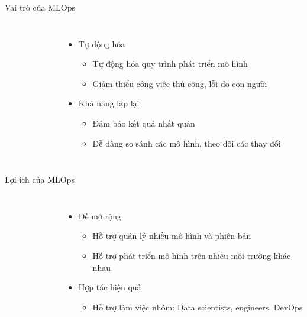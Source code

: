 \documentclass{beamer}
\begin{document}
\begin{frame}{Vai trò của MLOps}
    \begin{columns}
        \begin{figure}
            \centering
        \end{figure}
        \begin{itemize}
            \item Tự động hóa
            \begin{itemize}
                \item Tự động hóa quy trình phát triển mô hình
                \item Giảm thiểu công việc thủ công, lỗi do con người
            \end{itemize}
            \item Khả năng lặp lại
            \begin{itemize}
                \item Đảm bảo kết quả nhất quán
                \item Dễ dàng so sánh các mô hình, theo dõi các thay đổi
            \end{itemize}
        \end{itemize}
    \end{columns}
\end{frame}

\begin{frame}{Lợi ích của MLOps}
    \begin{columns}
        \begin{figure}
            \centering
        \end{figure}
        \begin{itemize}
            \item Dễ mở rộng
            \begin{itemize}
                \item Hỗ trợ quản lý nhiều mô hình và phiên bản
                \item Hỗ trợ phát triển mô hình trên nhiều môi trường khác nhau
            \end{itemize}
            \item Hợp tác hiệu quả
            \begin{itemize}
                \item Hỗ trợ làm việc nhóm: Data scientists, engineers, DevOps
            \end{itemize}
        \end{itemize}
    \end{columns}
\end{frame}
\end{document}
